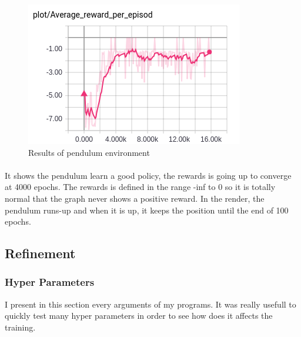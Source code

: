 \documentclass{article}
\begin{document}
\begin{figure}[ht]
  \centering
  \includegraphics[width=.5\textwidth]{avg_per_episode_pendulum}
  \caption{Results of pendulum environment}
  \label{fig:result_pendulum}
\end{figure}

\paragraph{}
It shows the pendulum learn a good policy, the rewards is going up to converge
at 4000 epochs. The rewards is defined in the range -inf to 0 so it is totally
normal that the graph never shows a positive reward. In the render, the pendulum
runs-up and when it is up, it keeps the position until the end of 100 epochs.

\subsection{Refinement}

\subsubsection{Hyper Parameters}
\label{subsubsec:hp_params}

I present in this section every arguments of my programs. It was really usefull
to quickly test many hyper parameters in order to see how does it affects the
training.
\end{document}
